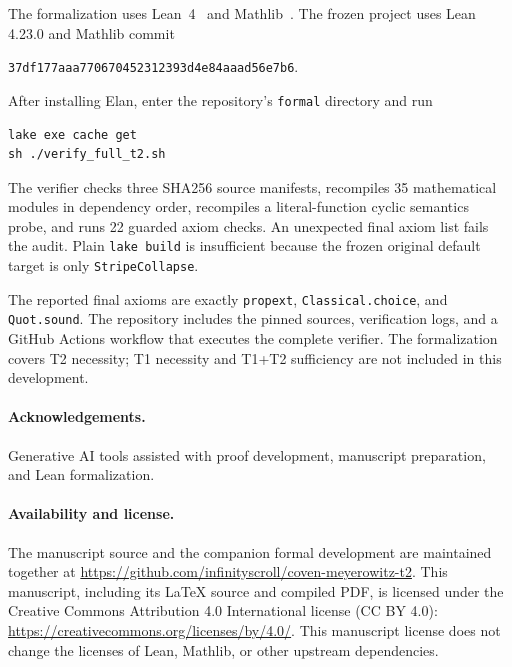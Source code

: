 \documentclass[11pt]{article}
\newcommand{\code}[1]{\texttt{\small #1}}
\begin{document}
The formalization uses Lean~4~\cite{Lean4} and Mathlib~\cite{Mathlib}. The frozen project uses Lean 4.23.0 and Mathlib commit
\begin{center}\code{37df177aaa770670452312393d4e84aaad56e7b6}.\end{center}
After installing Elan, enter the repository's \code{formal} directory and run
\begin{verbatim}
lake exe cache get
sh ./verify_full_t2.sh
\end{verbatim}
The verifier checks three SHA256 source manifests, recompiles 35 mathematical modules in dependency order, recompiles a literal-function cyclic semantics probe, and runs 22 guarded axiom checks. An unexpected final axiom list fails the audit. Plain \code{lake build} is insufficient because the frozen original default target is only \code{StripeCollapse}.

The reported final axioms are exactly \code{propext}, \code{Classical.choice}, and \code{Quot.sound}. The repository includes the pinned sources, verification logs, and a GitHub Actions workflow that executes the complete verifier. The formalization covers T2 necessity; T1 necessity and T1+T2 sufficiency are not included in this development.

\paragraph{Acknowledgements.}
Generative AI tools assisted with proof development, manuscript preparation, and Lean formalization.

\paragraph{Availability and license.}
The manuscript source and the companion formal development are maintained together at \url{https://github.com/infinityscroll/coven-meyerowitz-t2}. This manuscript, including its LaTeX source and compiled PDF, is licensed under the Creative Commons Attribution 4.0 International license (CC BY 4.0): \url{https://creativecommons.org/licenses/by/4.0/}. This manuscript license does not change the licenses of Lean, Mathlib, or other upstream dependencies.
\end{document}
